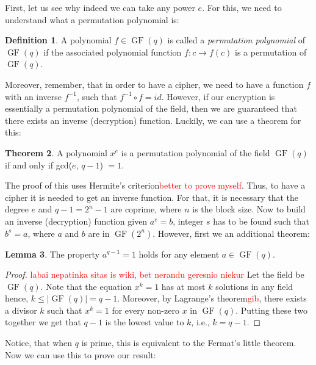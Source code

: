 \documentclass{Resources/UoBLab1}
\theoremstyle{definition}
\newtheorem{theorem}{Theorem}[section]
\newtheorem{definition}[theorem]{Definition}
\newtheorem{lemma}[theorem]{Lemma}
\begin{document}
First, let us see why indeed we can take any power $e$. For this, we need to understand what a permutation polynomial is:
\begin{definition}
    A polynomial $f \in \operatorname{GF}(q)$ is called a \textit{permutation polynomial} of $\operatorname{GF}(q)$ if the associated polynomial function $f : c \to f(c)$ is a permutation of $\operatorname{GF}(q)$. 
\end{definition}
Moreover, remember, that in order to have a cipher, we need to have a function $f$ with an inverse $f^{-1}$, such that $f^{-1} \circ f = id$. However, if our encryption is essentially a permutation polynomial of the field, then we are guaranteed that there exists an inverse (decryption) function. Luckily, we can use a theorem for this:
\begin{theorem}
    A polynomial $x^e$ is a permutation polynomial of the field $\operatorname{GF}(q)$ if and only if gcd($e$, $q - 1$) $= 1$.
\end{theorem}
The proof of this uses Hermite's criterion\cite{PPIntro}\textcolor{red}{better to prove myself}. Thus, to have a cipher it is needed to get an inverse function. For that, it is necessary that the degree $e$ and $q - 1 = 2^n - 1$ are coprime, where $n$ is the block size. Now to build an inverse (decryption) function given $a^e = b$, integer $s$ has to be found such that $b^s = a$, where $a$ and $b$ are in $\operatorname{GF}(2^n)$. However, first we an additional theorem:
\begin{lemma}\label{GroupProp}
    The property $a^{q-1} = 1$ holds for any element $a \in \operatorname{GF}(q)$.
\end{lemma}
\begin{proof}
    \textcolor{red}{labai nepatinka sitas is wiki, bet nerandu geresnio niekur} Let the field be $\operatorname{GF}(q)$. Note that the equation $x^k = 1$ has at most $k$ solutions in any field hence, $k \le |\operatorname{GF}(q)| = q - 1$. Moreover, by Lagrange's theorem\textcolor{red}{gib}, there exists a divisor $k$ such that $x^k = 1$ for every non-zero $x$ in $\operatorname{GF}(q)$. Putting these two together we get that $q-1$ is the lowest value to $k$, i.e., $k = q - 1$.
\end{proof}
Notice, that when $q$ is prime, this is equivalent to the Fermat's little theorem. Now we can use this to prove our result:
\end{document}
